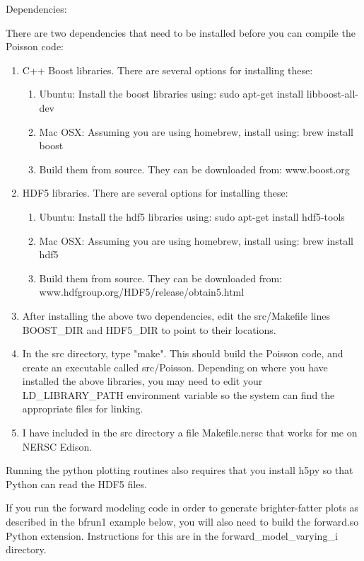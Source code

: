 \documentclass{article} %
\begin{document}
Dependencies:

There are two dependencies that need to be installed before you can compile the Poisson code:
\begin{enumerate}
  \item C++ Boost libraries.  There are several options for installing these:
    \begin{enumerate}
      \item Ubuntu: Install the boost libraries using: sudo apt-get install libboost-all-dev
      \item Mac OSX: Assuming you are using homebrew, install using: brew install boost
      \item Build them from source.  They can be downloaded from: www.boost.org
    \end{enumerate}
  \item HDF5 libraries.  There are several options for installing these:
    \begin{enumerate}
      \item Ubuntu: Install the hdf5 libraries using: sudo apt-get install hdf5-tools
      \item Mac OSX: Assuming you are using homebrew, install using: brew install hdf5
      \item Build them from source.  They can be downloaded from: www.hdfgroup.org/HDF5/release/obtain5.html
    \end{enumerate}
  \item After installing the above two dependencies, edit the src/Makefile lines  BOOST\_DIR and HDF5\_DIR to point to their locations.
  \item In the src directory, type "make".  This should build the Poisson code, and create an executable called src/Poisson. Depending on where you have installed the above libraries, you may need to edit your LD\_LIBRARY\_PATH environment variable so the system can find the appropriate files for linking.
  \item I have included in the src directory a file Makefile.nersc that works for me on NERSC Edison.
\end{enumerate}
Running the python plotting routines also requires that you install h5py so that Python can read the HDF5 files.

If you run the forward modeling code in order to generate brighter-fatter plots as described in the bfrun1 example below, you will also need to build the forward.so Python extension.  Instructions for this are in the forward\_model\_varying\_i directory.
\end{document}
